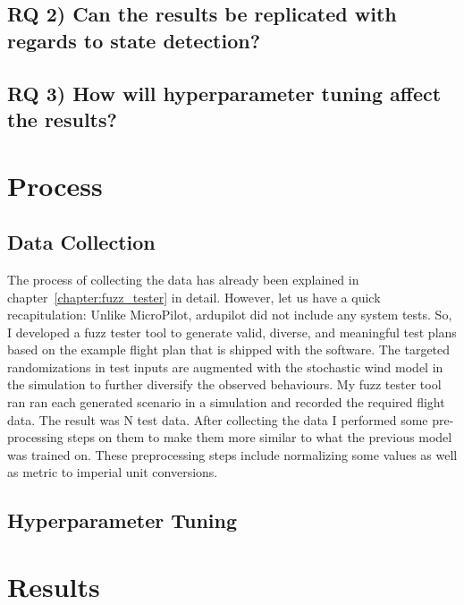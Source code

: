 \subsection{RQ 2) Can the results be replicated with regards to state detection?}

\subsection{RQ 3) How will hyperparameter tuning affect the results?}


\section{Process}
\subsection{Data Collection}
The process of collecting the data has already been explained in chapter~\ref{chapter:fuzz_tester} in detail. However, let us have a quick recapitulation:
Unlike MicroPilot, ardupilot did not include any system tests. So, I developed a fuzz tester tool to generate valid, diverse, and meaningful test plans based on the example flight plan that is shipped with the software. The targeted randomizations in test inputs are augmented with the stochastic wind model in the simulation to further diversify the observed behaviours. My fuzz tester tool ran ran each generated scenario in a simulation and recorded the required flight data.
The result was N %
test data.
After collecting the data I performed some pre-processing steps on them to make them more similar to what the previous model was trained on. These preprocessing steps include normalizing some values as well as metric to imperial unit conversions.


\subsection{Hyperparameter Tuning}


\section{Results}

